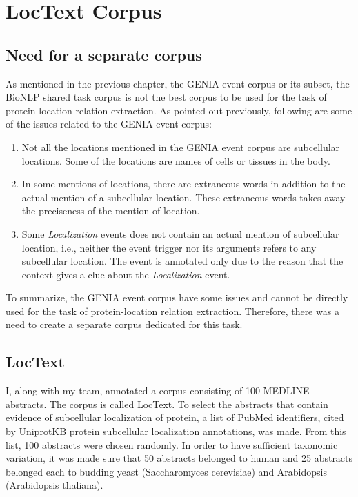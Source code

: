 \chapter{LocText Corpus}\label{chapter:corpus}

\section{Need for a separate corpus}

As mentioned in the previous chapter, the GENIA event corpus or its subset, the BioNLP shared task corpus is not the best corpus to be used for the task of protein-location relation extraction. As pointed out previously, following are some of the issues related to the GENIA event corpus:

\begin{enumerate}

\item Not all the locations mentioned in the GENIA event corpus are subcellular locations. Some of the locations are names of cells or tissues in the body.

\item In some mentions of locations, there are extraneous words in addition to the actual  mention of a subcellular location. These extraneous words takes away the preciseness of the mention of location.

\item Some \textit{Localization} events does not contain an actual mention of subcellular location, i.e., neither the event trigger nor its arguments refers to any subcellular location. The event is annotated only due to the reason that the context gives a clue about the \textit{Localization} event.

\end{enumerate}

To summarize, the GENIA event corpus have some issues and cannot be directly used for the task of protein-location relation extraction. Therefore, there was a need to create a separate corpus dedicated for this task.

\section{LocText}

I, along with my team, annotated a corpus consisting of 100 MEDLINE \cite{medline} abstracts. The corpus is called LocText. To select the abstracts that contain evidence of subcellular localization of protein, a list of PubMed \cite{pubmed} identifiers, cited by UniprotKB \cite{magrane2011uniprot} protein subcellular localization annotations, was made. From this list, 100 abstracts were chosen randomly. In order to have sufficient taxonomic variation, it was made sure that 50 abstracts belonged to human and 25 abstracts belonged each to budding yeast (Saccharomyces cerevisiae) and Arabidopsis (Arabidopsis thaliana).


